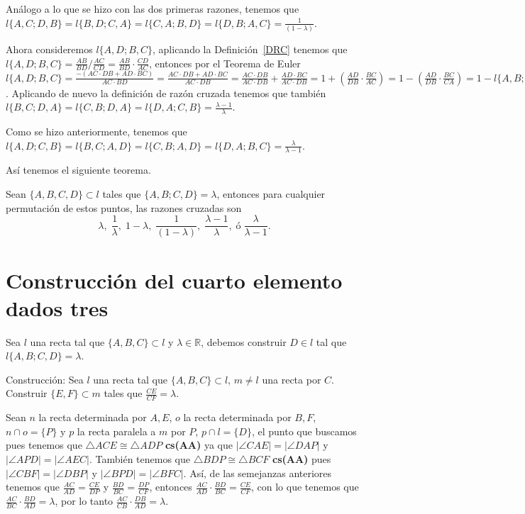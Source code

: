 Análogo a lo que se hizo con las dos primeras razones, tenemos que $l\{A,C;D,B\}=l\{B,D;C,A\}=l\{C,A;B,D\}=l\{D,B;A,C\}=\frac{1}{(1-\lambda)}$.

Ahora consideremos $l\{A,D;B,C\}$, aplicando la Definición~\ref{DRC} tenemos que $l\{A,D;B,C\}=\frac{AB}{BD}\Big/\frac{AC}{CD}=\frac{AB}{BD}\cdot\frac{CD}{AC}$, entonces por el Teorema de Euler $l\{A,D;B,C\}=\frac{-(AC\cdot DB+AD\cdot BC)}{AC\cdot BD}=\frac{AC\cdot DB+AD\cdot BC}{AC\cdot DB}=\frac{AC\cdot DB}{AC\cdot DB}+\frac{AD\cdot BC}{AC\cdot DB}=1+\left(\frac{AD}{DB}\cdot\frac{BC}{AC}\right)=1-\left(\frac{AD}{DB}\cdot\frac{BC}{CA}\right)=1-l\{A,B;D,C\}=1-\frac{1}{\lambda}=\frac{\lambda -1}{\lambda}$. Aplicando de nuevo la definición de razón cruzada tenemos que también $l\{B,C;D,A\}=l\{C,B;D,A\}=l\{D,A;C,B\}=\frac{\lambda -1}{\lambda}$.

Como se hizo anteriormente, tenemos que $l\{A,D;C,B\}=l\{B,C;A,D\}=l\{C,B;A,D\}=l\{D,A;B,C\}=\frac{\lambda}{\lambda - 1}$.

Así tenemos el siguiente teorema.
\begin{teo}
Sean $\{A,B,C,D\}\subset l$ tales que $\{A,B;C,D\}=\lambda$, entonces para cualquier permutación de estos puntos, las razones cruzadas son 
$$\lambda,\;\frac{1}{\lambda},\; 1-\lambda,\;\frac{1}{(1-\lambda)},\;\frac{\lambda -1}{\lambda},\;\text{ó}\;\frac{\lambda}{\lambda - 1}.$$
\end{teo}


\section{Construcción del cuarto elemento dados tres}

Sea $l$ una recta tal que $\{A,B,C\}\subset l$ y $\lambda\in\mathbb{R}$, debemos construir $D\in l$ tal que $l\{A,B;C,D\}=\lambda$. 

Construcción: Sea $l$ una recta tal que $\{A,B,C\}\subset l$, $m\neq l$ una recta por $C$. Construir $\{E,F\}\subset m$ tales que $\frac{CE}{CF}=\lambda$. 

Sean $n$ la recta determinada por $A,E$, $o$ la recta determinada por $B,F$, $n\cap o=\{P\}$ y $p$ la recta paralela a $m$ por $P$, $p\cap l=\{D\}$, el punto que buscamos pues tenemos que $\triangle ACE\cong\triangle ADP$ \textbf{cs(AA)} ya que $|\angle CAE|=|\angle DAP|$ y $|\angle APD|=|\angle AEC|$. También tenemos que $\triangle BDP\cong\triangle BCF$ \textbf{cs(AA)} pues $|\angle CBF|=|\angle DBP|$ y $|\angle BPD|=|\angle BFC|$. Así, de las semejanzas anteriores tenemos que $\frac{AC}{AD}=\frac{CE}{DP}$ y $\frac{BD}{BC}=\frac{DP}{CF}$, entonces $\frac{AC}{AD}\cdot\frac{BD}{BC}=\frac{CE}{CF}$, con lo que tenemos que $\frac{AC}{BC}\cdot\frac{BD}{AD}=\lambda$, por lo tanto $\frac{AC}{CB}\cdot\frac{DB}{AD}=\lambda$.

